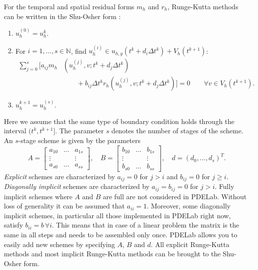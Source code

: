 \documentclass[a4paper,12pt]{article}
\begin{document}
For the temporal and spatial residual forms $m_h$ and $r_h$, Runge-Kutta
methods can be written in the Shu-Osher form
\cite{shu_osher_88,gottlieb2011strong}:
\begin{enumerate}
\item $u_h^{(0)} = u_h^{k}$.
\item For $i=1,\ldots,s\in\mathbb{N}$, find $u_h^{(i)}\in u_{h,g}(t^k+d_i \Delta t^k)
+ V_h(t^{k+1})$:
\begin{equation*}
\begin{split}
\sum\limits_{j=0}^{s} \biggl[a_{ij} m_h&\left(u_h^{(j)},v;t^k+d_j \Delta t^k\right) \\
&\qquad + b_{ij} \Delta t^k r_h\left(u_h^{(j)}, v;t^k+d_j \Delta t^k\right) \biggr] = 0
\qquad \forall v\in V_h(t^{k+1}).
\end{split}
\end{equation*}
\item $u_h^{k+1} = u_h^{(s)}$.
\end{enumerate}
Here we assume that the same type of boundary condition
holds through the interval $(t^k,t^{k+1}]$. The parameter $s$ denotes
the number of stages of the scheme.
An $s$-stage scheme is given by the parameters
\begin{equation*}
A = \left[\begin{array}{ccc}
a_{10} & \ldots & a_{1s}\\
\vdots &  & \vdots\\
a_{s0} & \ldots & a_{ss}
\end{array}\right],
\quad B = \left[\begin{array}{ccc}
b_{10} & \ldots & b_{1s}\\
\vdots &  & \vdots\\
b_{s0} & \ldots & b_{ss}
\end{array}\right],
\quad d = \left(
d_{0}, \ldots, d_{s}
\right)^T.
\end{equation*}
\textit{Explicit} schemes are characterized by $a_{ij} = 0$ for $j>i$ and $b_{ij}=0$ for $j\geq i$.
\textit{Diagonally implicit} schemes are characterized by $a_{ij} = b_{ij}= 0$ for $j>i$.
Fully implicit schemes where $A$ and $B$ are full are not considered in PDELab.
Without loss of generality it can be assumed that $a_{ii}=1$. Moreover,
some diagonally implicit schemes, in particular all those implemented in PDELab right
now, satisfy $b_{ii}=b\,\forall i$. This means that in case of a linear problem the matrix is the
same in all steps and needs to be assembled only once.
PDELab allows you to easily add new schemes by specifying $A$, $B$ and $d$.
All explicit Runge-Kutta methods and most implicit Runge-Kutta methods
can be brought to the Shu-Osher form.
\end{document}
